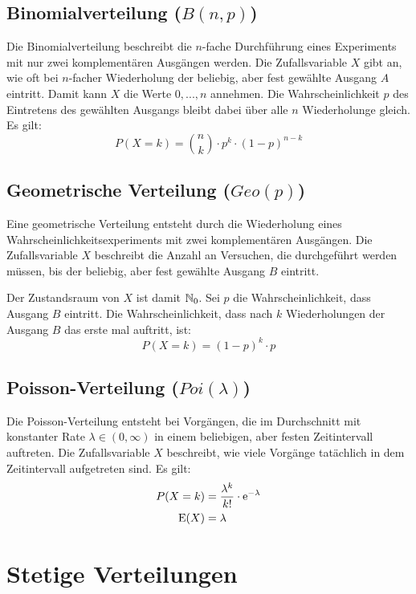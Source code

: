 \subsection{Binomialverteilung ($B(n,p)$)}

Die Binomialverteilung beschreibt die $n$-fache Durchführung eines Experiments
mit nur zwei komplementären Ausgängen werden. Die Zufallsvariable $X$ gibt an,
wie oft bei $n$-facher Wiederholung der beliebig, aber fest gewählte Ausgang $A$
eintritt. Damit kann $X$ die Werte $0, ..., n$ annehmen. Die Wahrscheinlichkeit
$p$ des Eintretens des gewählten Ausgangs bleibt dabei über alle $n$
Wiederholunge gleich. Es gilt:
\[
P(X=k) = \binom{n}{k}\cdot p^k\cdot(1-p)^{n-k}
\]

\subsection{Geometrische Verteilung ($Geo(p)$)}

Eine geometrische Verteilung entsteht durch die Wiederholung eines
Wahrscheinlichkeitsexperiments mit zwei komplementären Ausgängen. Die
Zufallsvariable $X$ beschreibt die Anzahl an Versuchen, die durchgeführt werden
müssen, bis der beliebig, aber fest gewählte Ausgang $B$ eintritt.

Der Zustandsraum von $X$ ist damit $\mathbb{N}_0$. Sei $p$ die Wahrscheinlichkeit, dass
Ausgang $B$ eintritt. Die Wahrscheinlichkeit, dass nach $k$ Wiederholungen der
Ausgang $B$ das erste mal auftritt, ist:
\[
P(X=k) = (1-p)^k\cdot p
\]

\subsection{Poisson-Verteilung ($Poi(\lambda)$)}

Die Poisson-Verteilung entsteht bei Vorgängen, die im Durchschnitt mit
konstanter Rate $\lambda \in (0, \infty)$ in einem beliebigen, aber
festen Zeitintervall auftreten. Die Zufallsvariable $X$ beschreibt, wie viele
Vorgänge tatächlich in dem Zeitintervall aufgetreten sind. Es gilt:
\begin{align*}
P(X=k) &= \frac{\lambda^k}{k!}\cdot\mathrm{e}^{-\lambda} \\
\operatorname{E}(X) &= \lambda
\end{align*}

\section{Stetige Verteilungen}

